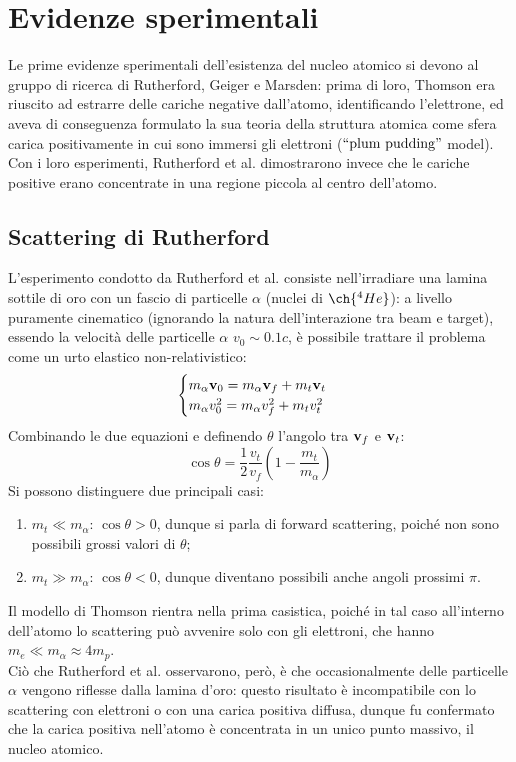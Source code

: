 \section{Evidenze sperimentali}

Le prime evidenze sperimentali dell'esistenza del nucleo atomico si devono al gruppo di ricerca di Rutherford, Geiger e Marsden: prima di loro, Thomson era riuscito ad estrarre delle cariche negative dall'atomo, identificando l'elettrone, ed aveva di conseguenza formulato la sua teoria della struttura atomica come sfera carica positivamente in cui sono immersi gli elettroni ($ ``\text{plum pudding}" $ model).\\
Con i loro esperimenti, Rutherford et al. dimostrarono invece che le cariche positive erano concentrate in una regione piccola al centro dell'atomo.

\subsection{Scattering di Rutherford}

L'esperimento condotto da Rutherford et al. consiste nell'irradiare una lamina sottile di oro con un fascio di particelle $ \alpha $ (nuclei di $ \ch{^{4} He} $): a livello puramente cinematico (ignorando la natura dell'interazione tra beam e target), essendo la velocità delle particelle $ \alpha $ $ v_0 \sim 0.1c $, è possibile trattare il problema come un urto elastico non-relativistico:
\begin{equation}
	\begin{cases}
	  m_{\alpha} \mathbf{v}_0 = m_{\alpha} \mathbf{v}_f + m_t \mathbf{v}_t \\
	  m_{\alpha} v_0^2 = m_{\alpha} v_f^2 + m_t v_t^2 \\
	\end{cases}
	\label{eq:2}
\end{equation}
Combinando le due equazioni e definendo $ \theta $ l'angolo tra $ \mathbf{v}_f $ e $ \mathbf{v}_t $:
\begin{equation}
	\cos \theta = \frac{1}{2} \frac{v_t}{v_f} \left(1 - \frac{m_t}{m_{\alpha}}\right)
	\label{eq:3}
\end{equation}
Si possono distinguere due principali casi:
\begin{enumerate}
	\item $ m_t \ll m_{\alpha} $: $ \cos \theta > 0 $, dunque si parla di forward scattering, poiché non sono possibili grossi valori di $ \theta $;
	\item $ m_t \gg m_{\alpha} $: $ \cos \theta < 0 $, dunque diventano possibili anche angoli prossimi $ \pi $.
\end{enumerate}
Il modello di Thomson rientra nella prima casistica, poiché in tal caso all'interno dell'atomo lo scattering può avvenire solo con gli elettroni, che hanno $ m_e \ll m_{\alpha} \approx 4m_p $.\\
Ciò che Rutherford et al. osservarono, però, è che occasionalmente delle particelle $ \alpha $ vengono riflesse dalla lamina d'oro: questo risultato è incompatibile con lo scattering con elettroni o con una carica positiva diffusa, dunque fu confermato che la carica positiva nell'atomo è concentrata in un unico punto massivo, il nucleo atomico.

